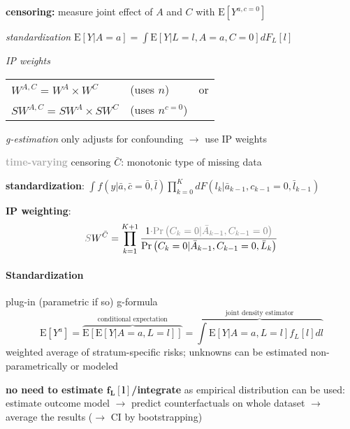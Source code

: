 \documentclass[8pt,twoside]{extarticle}
\begin{document}
\begin{multicols}{2}
 \textbf{censoring:} measure joint effect of $A$ and $C$ with
$\mathrm{E}\left[Y^{a, c=0}\right]$

 \textit{standardization} $\mathrm{E}\left[Y|A=a\right] = \int \mathrm{E}\left[Y|L{=}l, A{=}a, C{=}0\right]dF_L\left[l\right]$\vspace{0.2em}

 \textit{IP weights}\vspace{-1.30em}

\hspace{4.3em}\begin{tabular}{l l l}
$W^{A,C}=W^A \times W^C$  &(uses $n$) & or \\
$SW^{A,C}=SW^A \times SW^C$ &(uses $n^{c=0}$) & 
\end{tabular}\vspace{0.3em}

 \textit{g-estimation} only adjusts for confounding  $\rightarrow$ use IP weights

\vspace{0.2em}
 \colorbox{lightgray!20!white}{\begin{minipage}{28em}

\textbf{\textcolor{darkgray}{time-varying}} censoring $\bar{C}$: monotonic type of missing data 

 \textbf{standardization}: $\!\!\!\displaystyle\int\!\! f(y|\bar{a}, \bar{c}{=}\bar{0}, \bar{l}) \prod\limits_{k=0}^K dF\left(l_k|\bar{a}_{k-1}, c_{k-1} {=} 0, \bar{l}_{k-1}\right)$

 \textbf{IP weighting}:
 $$\textcolor{gray}{S}W^{\bar{C}}= \prod_{k=1}^{K+1}\frac{1\textcolor{gray}{\cdot \mathrm{Pr}\left(C_k=0|\bar{A}_{k-1}, C_{k-1}=0\right)}}{\mathrm{Pr}\left(C_k=0|\bar{A}_{k-1}, C_{k-1}=0, \bar{L}_k\right)} $$

\end{minipage}}




\paragraph{Standardization} plug-in (parametric if so) g-formula
$$\mathrm{E}\left[Y^{a}\right] = \overbrace{\mathrm{E}\left[\mathrm{E}\left[Y|A{=}a,L{=}l\right]\right]}^{\text{conditional expectation}} =  \overbrace{ \textstyle{\int} \mathrm{E}\left[Y|A=a, L=l\right]f_L\left[l\right]dl}^{\text{joint density estimator}} $$
weighted average of stratum-specific risks; unknowns can be estimated non-parametrically or modeled

 \textbf{no need to estimate $\boldsymbol{f_L\left[l\right]}$/integrate} as empirical distribution can be used: estimate outcome model $\rightarrow$ predict counterfactuals on whole dataset $\rightarrow$ average the results ($\rightarrow$ CI by bootstrapping)


\end{multicols}
\end{document}
